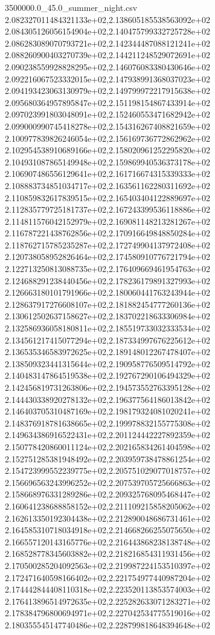 \begin{filecontents*}{3500000.0_45.0_summer_night.csv}
2.082327011484321133e+02,2.138605185538563092e+02
2.084305126056154904e+02,2.140475799332725728e+02
2.086283089070793721e+02,2.142344487088121241e+02
2.088260900403270739e+02,2.144211248529072691e+02
2.090238559928828295e+02,2.146076083380430646e+02
2.092216067523332015e+02,2.147938991368037023e+02
2.094193423063130979e+02,2.149799972217915638e+02
2.095680364957895847e+02,2.151198154867433914e+02
2.097023991803048091e+02,2.152460553471682942e+02
2.099000990745418278e+02,2.154316267408821659e+02
2.100977839826246054e+02,2.156169736772862962e+02
2.102954538910689166e+02,2.158020961252295820e+02
2.104931087865149948e+02,2.159869940536373178e+02
2.106907486556129641e+02,2.161716674315339333e+02
2.108883734851034717e+02,2.163561162280311692e+02
2.110859832617839515e+02,2.165403404122889697e+02
2.112835779725181737e+02,2.167243399536118886e+02
2.114811576042152979e+02,2.169081148213281267e+02
2.116787221438762856e+02,2.170916649848850284e+02
2.118762715785235287e+02,2.172749904137972408e+02
2.120738058952826464e+02,2.174580910776721794e+02
2.122713250813088735e+02,2.176409669461954763e+02
2.124688291238440456e+02,2.178236179891327993e+02
2.126663180101791966e+02,2.180060441763243944e+02
2.128637917276608107e+02,2.181882454777260136e+02
2.130612502637158627e+02,2.183702218633306984e+02
2.132586936058180811e+02,2.185519733032333534e+02
2.134561217415077294e+02,2.187334997676225612e+02
2.136535346583972625e+02,2.189148012267478407e+02
2.138509323441315644e+02,2.190958776509514792e+02
2.140483147864519538e+02,2.192767290106494329e+02
2.142456819731263806e+02,2.194573552763395128e+02
2.144430338920278132e+02,2.196377564186013842e+02
2.146403705310487169e+02,2.198179324081020241e+02
2.148376918781638665e+02,2.199978832155775308e+02
2.149634386916522431e+02,2.201124442227892359e+02
2.150778420860011124e+02,2.202165834261404598e+02
2.152751285381948492e+02,2.203959738478861254e+02
2.154723999552239775e+02,2.205751029077018757e+02
2.156696563243996252e+02,2.207539705725666863e+02
2.158668976331289286e+02,2.209325768095468447e+02
2.160641238688858152e+02,2.211109215858205062e+02
2.162613350192304438e+02,2.212890048686731461e+02
2.164585310718034918e+02,2.214668266255075650e+02
2.166557120143165776e+02,2.216443868238138748e+02
2.168528778345603882e+02,2.218216854311931456e+02
2.170500285204092563e+02,2.219987224153510397e+02
2.172471640598166402e+02,2.221754977440987204e+02
2.174442844408110318e+02,2.223520113853574003e+02
2.176413896514972635e+02,2.225282633071283271e+02
2.178384796800694971e+02,2.227042534775519016e+02
2.180355545147740486e+02,2.228799818648394648e+02

\end{filecontents*}
